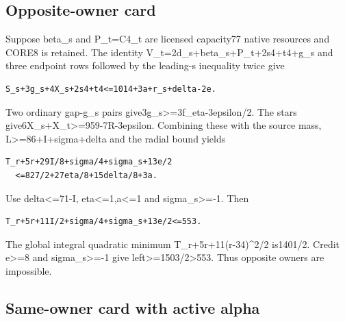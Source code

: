 \documentclass[10pt,a4paper]{article}
\theoremstyle{definition}
\begin{document}
\hypertarget{opposite-owner-card}{%
\subsection{Opposite-owner card}\label{opposite-owner-card}}

Suppose beta\_\allowbreak{}s and P\_\allowbreak{}t=\allowbreak{}C4\_\allowbreak{}t are licensed capacity77 native resources
and CORE8 is retained. The identity V\_\allowbreak{}t=\allowbreak{}2d\_\allowbreak{}s+\allowbreak{}beta\_\allowbreak{}s+\allowbreak{}P\_\allowbreak{}t+\allowbreak{}2s4+\allowbreak{}t4+\allowbreak{}g\_\allowbreak{}s
and three endpoint rows followed by the leading-s inequality twice give

\begin{lstlisting}
S_s+3g_s+4X_s+2s4+t4<=1014+3a+r_s+delta-2e.
\end{lstlisting}

Two ordinary gap-g\_\allowbreak{}s pairs give3g\_\allowbreak{}s\textgreater=\allowbreak{}3f\_\allowbreak{}eta-3epsilon/2.
The stars give6X\_\allowbreak{}s+\allowbreak{}X\_\allowbreak{}t\textgreater=\allowbreak{}959-7R-3epsilon. Combining these
with the source mass,\allowbreak{} L\textgreater=\allowbreak{}86+\allowbreak{}I+\allowbreak{}sigma+\allowbreak{}delta and the radial
bound yields

\begin{lstlisting}
T_r+5r+29I/8+sigma/4+sigma_s+13e/2
  <=827/2+27eta/8+15delta/8+3a.
\end{lstlisting}

Use delta\textless=\allowbreak{}71-I,\allowbreak{} eta\textless=\allowbreak{}1,\allowbreak{}a\textless=\allowbreak{}1 and
sigma\_\allowbreak{}s\textgreater=\allowbreak{}-1. Then

\begin{lstlisting}
T_r+5r+11I/2+sigma/4+sigma_s+13e/2<=553.
\end{lstlisting}

The global integral quadratic minimum T\_\allowbreak{}r+\allowbreak{}5r+\allowbreak{}11(r-34)\^{}2/2 is1401/2.
Credit e\textgreater=\allowbreak{}8 and sigma\_\allowbreak{}s\textgreater=\allowbreak{}-1 give
left\textgreater=\allowbreak{}1503/2\textgreater553. Thus opposite owners are
impossible.

\hypertarget{same-owner-card-with-active-alpha}{%
\subsection{Same-owner card with active
alpha}\label{same-owner-card-with-active-alpha}}
\end{document}
